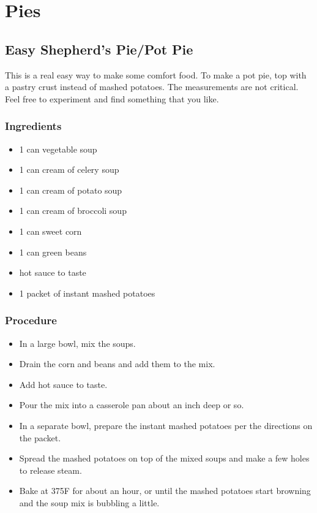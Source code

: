 \documentclass[10pt, openany]{book}
\begin{document}
\chapter{Pies}
\section{Easy Shepherd's Pie/Pot Pie}
\label{pie:ShepherdsPie}
This is a real easy way to make some comfort food.  To make a pot pie, top with a pastry crust instead of mashed potatoes.  The measurements are not critical.  Feel free to experiment and find something that you like.
\subsection{Ingredients}
\begin{itemize}
  \item 1 can vegetable soup
  \item 1 can cream of celery soup
  \item 1 can cream of potato soup
  \item 1 can cream of broccoli soup
  \item 1 can sweet corn
  \item 1 can green beans
  \item hot sauce to taste
  \item 1 packet of instant mashed potatoes
\end{itemize}
\subsection{Procedure}
\begin{itemize}
  \item In a large bowl, mix the soups.
  \item Drain the corn and beans and add them to the mix.
  \item Add hot sauce to taste.
  \item Pour the mix into a casserole pan about an inch deep or so.
  \item In a separate bowl, prepare the instant mashed potatoes per the directions on the packet.
  \item Spread the mashed potatoes on top of the mixed soups and make a few holes to release steam.
  \item Bake at 375\degree{}F for about an hour, or until the mashed potatoes start browning and the soup mix is bubbling a little.
\end{itemize}
\end{document}
